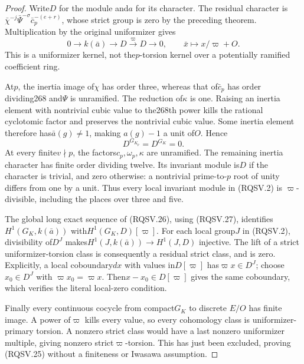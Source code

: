 \begin{proof}
Write$D$ for the module and$a$ for its character.
The residual character is
$\bar\chi^{-j}\bar\Psi^{-\sigma}\bar c_p^{-(e+r)}$,
whose strict group is zero by the preceding theorem.
Multiplication by the original uniformizer gives
\[
 0\longrightarrow k(\bar a)\longrightarrow D
       \xrightarrow{\varpi}D\longrightarrow0,
 \qquad \bar x\longmapsto x/\varpi+O.
 \tag{RQSV.26}
\]
This is a uniformizer kernel, not the$p$-torsion kernel over
a potentially ramified coefficient ring.

At$p$, the inertia image of$\chi$ has order three, whereas
that of$\bar c_p$ has order dividing268 and$\Psi$ is unramified.
The reduction of$\kappa$ is one.  Raising an inertia element
with nontrivial cubic value to the268th power kills the rational
cyclotomic factor and preserves the nontrivial cubic value.
Some inertia element therefore has$\bar a(g)\ne1$, making
$a(g)-1$ a unit of$O$.  Hence
\[
                        D^{G_{K_p}}=D^{G_K}=0.
 \tag{RQSV.27}
\]
At every finite$v\nmid p$, the factors$c_p,\omega_p,\kappa$
are unramified.  The remaining inertia character has finite
order dividing twelve.  Its invariant module is$D$ if the
character is trivial, and zero otherwise: a nontrivial
prime-to-$p$ root of unity differs from one by a unit.
Thus every local invariant module in (RQSV.2) is
$\varpi$-divisible, including the places over three and five.

The global long exact sequence of (RQSV.26), using (RQSV.27),
identifies$H^1(G_K,k(\bar a))$ with$H^1(G_K,D)[\varpi]$.
For each local group$J$ in (RQSV.2), divisibility of$D^J$
makes$H^1(J,k(\bar a))\to H^1(J,D)$ injective.
The lift of a strict uniformizer-torsion class is consequently
a residual strict class, and is zero.
Explicitly, a local coboundary$dx$ with values in$D[\varpi]$
has$\varpi x\in D^J$; choose$x_0\in D^J$ with
$\varpi x_0=\varpi x$.  Then$x-x_0\in D[\varpi]$ gives the
same coboundary, which verifies the literal local-zero condition.

Finally every continuous cocycle from compact$G_K$ to discrete
$E/O$ has finite image.  A power of$\varpi$ kills every value,
so every cohomology class is uniformizer-primary torsion.
A nonzero strict class would have a last nonzero uniformizer
multiple, giving nonzero strict$\varpi$-torsion.  This has just
been excluded, proving (RQSV.25) without a finiteness or Iwasawa
assumption.
\end{proof}

